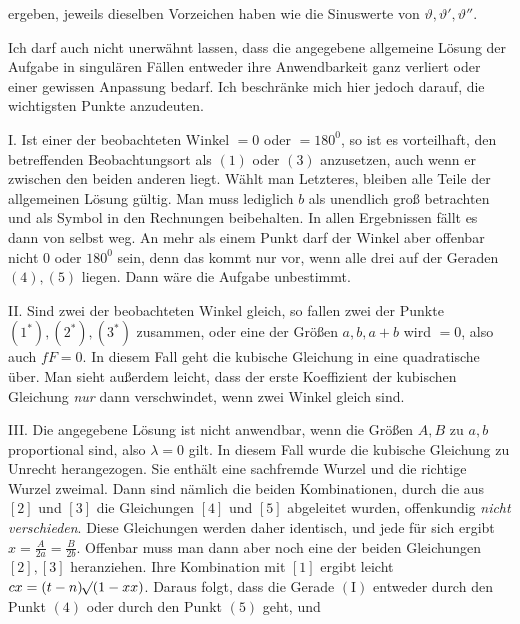 %
ergeben, jeweils dieselben Vorzeichen haben wie die Sinuswerte von \(\vartheta,\vartheta',\vartheta''\).

Ich darf auch nicht unerwähnt lassen, dass die angegebene allgemeine Lösung der Aufgabe in singulären Fällen entweder ihre Anwendbarkeit ganz verliert oder einer gewissen Anpassung bedarf. Ich beschränke mich hier jedoch darauf, die wichtigsten Punkte anzudeuten.

I. Ist einer der beobachteten Winkel \(=0\) oder \(=180^0\), so ist es vorteilhaft, den betreffenden Beobachtungsort als \((1)\) oder \((3)\) anzusetzen, auch wenn er zwischen den beiden anderen liegt. Wählt man Letzteres, bleiben alle Teile der allgemeinen Lösung gültig. Man muss lediglich \(b\) als unendlich groß betrachten und als Symbol in den Rechnungen beibehalten. In allen Ergebnissen fällt es dann von selbst weg. An mehr als einem Punkt darf der Winkel aber offenbar nicht \(0\) oder \(180^0\) sein, denn das kommt nur vor, wenn alle drei auf der Geraden \((4),(5)\) liegen. Dann wäre die Aufgabe unbestimmt.

II. Sind zwei der beobachteten Winkel gleich, so fallen zwei der Punkte \((1^*),(2^*),(3^*)\) zusammen, oder eine der Größen \(a,b,a+b\) wird \(=0\), also auch \(fF=0\). In diesem Fall geht die kubische Gleichung in eine quadratische über. Man sieht außerdem leicht, dass der erste Koeffizient der kubischen Gleichung \textit{nur} dann verschwindet, wenn zwei Winkel gleich sind.

III. Die angegebene Lösung ist nicht anwendbar, wenn die Größen \(A,B\) zu \(a,b\) proportional sind, also \(\lambda=0\) gilt. In diesem Fall wurde die kubische Gleichung zu Unrecht herangezogen. Sie enthält eine sachfremde Wurzel und die richtige Wurzel zweimal. Dann sind nämlich die beiden Kombinationen, durch die aus \([2]\) und \([3]\) die Gleichungen \([4]\) und \([5]\) abgeleitet wurden, offenkundig \textit{nicht verschieden}. Diese Gleichungen werden daher identisch, und jede für sich ergibt \(x=\frac A{2a}=\frac B{2b}\). Offenbar muss man dann aber noch eine der beiden Gleichungen \([2],[3]\) heranziehen. Ihre Kombination mit \([1]\) ergibt leicht \(cx=(t-n)\mathord{{}^{}\!\surd}(1-xx)\). Daraus folgt, dass die Gerade \(\mathrm{(I)}\) entweder durch den Punkt \((4)\) oder durch den Punkt \((5)\) geht, und

